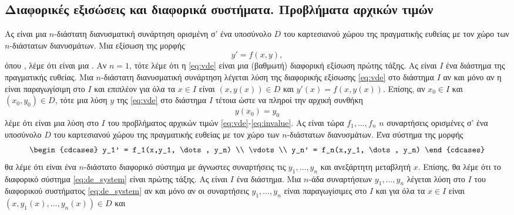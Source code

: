 \documentclass[11pt,a4paper,twoside]{book}
\begin{document}
\subsection{Διαφορικές εξισώσεις και διαφορικά συστήματα. Προβλήματα αρχικών τιμών}
Ας είναι  μια $n$-διάστατη διανυσματική συνάρτηση ορισμένη σ' ένα υποσύνολο $D$ του καρτεσιανού χώρου της πραγματικής ευθείας με τον χώρο των $n$-διάστατων διανυσμάτων. Μια εξίσωση της μορφής
\begin{equation}\label{eq:vde}
y' = f(x,y),
\end{equation}
όπου , λέμε ότι είναι μια . Αν $n=1$, τότε λέμε ότι η \eqref{eq:vde} είναι μια (βαθμωτή) διαφορική εξίσωση πρώτης τάξης. Ας είναι $I$ ένα διάστημα της πραγματικής ευθείας. Μια $n$-διάστατη διανυσματική συνάρτηση  λέγεται λύση της διαφορικής εξίσωσης \eqref{eq:vde} στο διάστημα $I$ αν και μόνο αν η  είναι παραγωγίσιμη στο $I$ και επιπλέον για όλα τα $x \in I$ είναι $(x,y(x)) \in D$ και $y'(x) = f(x,y(x))$. Επίσης, αν $x_0 \in I$ και $(x_0,y_0) \in D$, τότε μια λύση $y$ της \eqref{eq:vde} στο διάστημα $I$ τέτοια ώστε να πληροί την αρχική συνθήκη
\begin{equation}\label{eq:invalue}
y(x_0) = y_0
\end{equation}
λέμε ότι είναι μια λύση στο $I$ του προβλήματος αρχικών τιμών \eqref{eq:vde}-\eqref{eq:invalue}.
Ας είναι τώρα $f_1, \dots, f_n$ $n$ συναρτήσεις ορισμένες σ' ένα υποσύνολο $D$ του καρτεσιανού χώρου της πραγματικής ευθείας με τον χώρο των $n$-διάστατων διανυσμάτων. Ένα σύστημα της μορφής
\begin{equation}\label{eq:de_system}
\begin{cdcases}
y_1' = f_1(x,y_1, \dots, y_n) \\
\vdots \\
y_n' = f_n(x,y_1, \dots, y_n)
\end{cdcases}
\end{equation}
θα λέμε ότι είναι ένα $n$-διάστατο διαφορικό σύστημα με άγνωστες συναρτήσεις τις $y_1, \dots, y_n$ και ανεξάρτητη μεταβλητή $x$. Επίσης, θα λέμε ότι το διαφορικό σύστημα \eqref{eq:de_system} είναι πρώτης τάξης. Ας είναι $I$ ένα διάστημα. Μια $n$-άδα συναρτήσεων $y_1, \dots, y_n$ λέγεται λύση στο $I$ του διαφορικού συστήματος \eqref{eq:de_system} αν και μόνο αν οι συναρτήσεις $y_1, \dots, y_n$ είναι παραγωγίσιμες στο $I$ και για όλα τα $x \in I$ είναι $(x,y_1(x), \dots, y_n(x)) \in D$ και
\end{document}
